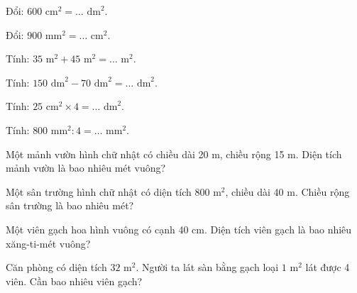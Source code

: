 \begin{ex}
Đổi: $600\text{ cm}^2 = \dots\text{ dm}^2$.
\end{ex}

\begin{ex}
Đổi: $900\text{ mm}^2 = \dots\text{ cm}^2$.
\end{ex}

\begin{ex}
Tính: $35\text{ m}^2 + 45\text{ m}^2 = \dots\text{ m}^2$.
\end{ex}

\begin{ex}
Tính: $150\text{ dm}^2 - 70\text{ dm}^2 = \dots\text{ dm}^2$.
\end{ex}

\begin{ex}
Tính: $25\text{ cm}^2 \times 4 = \dots\text{ dm}^2$.
\end{ex}

\begin{ex}
Tính: $800\text{ mm}^2 : 4 = \dots\text{ mm}^2$.
\end{ex}

\begin{ex}
Một mảnh vườn hình chữ nhật có chiều dài 20 m, chiều rộng 15 m. Diện tích mảnh vườn là bao nhiêu mét vuông?
\end{ex}

\begin{ex}
Một sân trường hình chữ nhật có diện tích $800\text{ m}^2$, chiều dài 40 m. Chiều rộng sân trường là bao nhiêu mét?
\end{ex}

\begin{ex}
Một viên gạch hoa hình vuông có cạnh 40 cm. Diện tích viên gạch là bao nhiêu xăng-ti-mét vuông?
\end{ex}

\begin{ex}
Căn phòng có diện tích $32\text{ m}^2$. Người ta lát sàn bằng gạch loại $1\text{ m}^2$ lát được 4 viên. Cần bao nhiêu viên gạch?
\end{ex}

